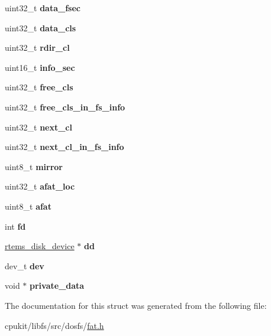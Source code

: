 \begin{DoxyCompactItemize}
uint32\+\_\+t {\bfseries data\+\_\+fsec}
\item 
\mbox{\label{structfat__vol__s_a6da6596bcd9957064d2adb2a25c8b09e}} 
uint32\+\_\+t {\bfseries data\+\_\+cls}
\item 
\mbox{\label{structfat__vol__s_ae95ef04b12bdffbd034b347f2f350a1e}} 
uint32\+\_\+t {\bfseries rdir\+\_\+cl}
\item 
\mbox{\label{structfat__vol__s_a101a644766afdde4a0a5cc81e2ae5536}} 
uint16\+\_\+t {\bfseries info\+\_\+sec}
\item 
\mbox{\label{structfat__vol__s_a36e4eace00897a612a8fa7952a701586}} 
uint32\+\_\+t {\bfseries free\+\_\+cls}
\item 
\mbox{\label{structfat__vol__s_a56e23293368fab301422d4a2f624d59d}} 
uint32\+\_\+t {\bfseries free\+\_\+cls\+\_\+in\+\_\+fs\+\_\+info}
\item 
\mbox{\label{structfat__vol__s_a4ec1c604409e7202dfdaaf898f8426fb}} 
uint32\+\_\+t {\bfseries next\+\_\+cl}
\item 
\mbox{\label{structfat__vol__s_afeac4a3deb36b6aa43658048f105e67a}} 
uint32\+\_\+t {\bfseries next\+\_\+cl\+\_\+in\+\_\+fs\+\_\+info}
\item 
\mbox{\label{structfat__vol__s_af2a50b159293de1351c1fbe3d6ec30a0}} 
uint8\+\_\+t {\bfseries mirror}
\item 
\mbox{\label{structfat__vol__s_a3488aee299a4828db06bf59514197bc5}} 
uint32\+\_\+t {\bfseries afat\+\_\+loc}
\item 
\mbox{\label{structfat__vol__s_af41451fb1ffb68f802c6d6d1c3f03df0}} 
uint8\+\_\+t {\bfseries afat}
\item 
\mbox{\label{structfat__vol__s_af3bd3b56e7ce2e376abdc0f510df84e2}} 
int {\bfseries fd}
\item 
\mbox{\label{structfat__vol__s_ac3b03d9de9bbbdd929a143756f424454}} 
\mbox{\hyperlink{structrtems__disk__device}{rtems\+\_\+disk\+\_\+device}} $\ast$ {\bfseries dd}
\item 
\mbox{\label{structfat__vol__s_a8641b46798306e62bc843ec282fdb4a3}} 
dev\+\_\+t {\bfseries dev}
\item 
\mbox{\label{structfat__vol__s_a8e894f199d179f4d22732fbab50a9a6c}} 
void $\ast$ {\bfseries private\+\_\+data}
\end{DoxyCompactItemize}


The documentation for this struct was generated from the following file\+:\begin{DoxyCompactItemize}
\item 
cpukit/libfs/src/dosfs/\mbox{\hyperlink{fat_8h}{fat.\+h}}\end{DoxyCompactItemize}
